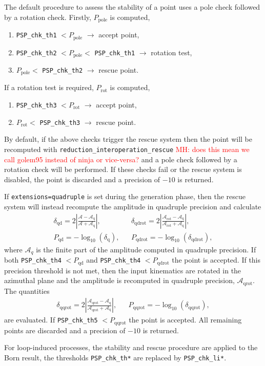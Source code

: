 The default procedure to assess the stability of a point uses a pole check followed by a rotation check.
Firstly, $P_\mathrm{pole}$ is computed,
\begin{enumerate}
\item \texttt{PSP\_chk\_th1} $< P_\mathrm{pole}$ $\rightarrow$ accept point,
\item \texttt{PSP\_chk\_th2} $< P_\mathrm{pole} < $ \texttt{PSP\_chk\_th1} $\rightarrow$ rotation test,
\item $P_\mathrm{pole} <$ \texttt{PSP\_chk\_th2} $\rightarrow$ rescue point.
\end{enumerate}
If a rotation test is required, $P_\mathrm{rot}$ is computed,
\begin{enumerate}
\item \texttt{PSP\_chk\_th3} $< P_\mathrm{rot}$ $\rightarrow$ accept point,
\item  $P_\mathrm{rot} <$ \texttt{PSP\_chk\_th3} $\rightarrow$ rescue point.
\end{enumerate}

By default, if the above checks trigger the rescue system then the point will be recomputed with \texttt{reduction\_interoperation\_rescue} \textcolor{red}{MH: does this mean we call golem95 instead of ninja or vice-versa?} and a pole check followed by a rotation check will be performed.
If these checks fail or the rescue system is disabled, the point is discarded and a precision of $-10$ is returned.

If \texttt{extensions=quadruple} is set during the \gosam generation phase, then the rescue system will instead recompute the amplitude in quadruple precision and calculate
\begin{align}
&\delta_\mathrm{qd} = 2 \left| \frac{\mathcal{A}-\mathcal{A}_\mathrm{q}}{\mathcal{A}+\mathcal{A}_\mathrm{q}} \right|,&
&\delta_\mathrm{qdrot} = 2 \left| \frac{\mathcal{A}_\mathrm{rot}-\mathcal{A}_\mathrm{q}}{\mathcal{A}_\mathrm{rot}+\mathcal{A}_\mathrm{q}} \right|, & \\
&P_\mathrm{qd} = -\log_\mathrm{10}(\delta_\mathrm{q}),&
&P_\mathrm{qdrot} = -\log_\mathrm{10}(\delta_\mathrm{qdrot}),&
\end{align}
where $\mathcal{A}_q$ is the finite part of the amplitude computed in quadruple precision.
If both \texttt{PSP\_chk\_th4} $< P_\mathrm{qd}$ and \texttt{PSP\_chk\_th4} $< P_\mathrm{qdrot}$ the point is accepted.
If this precision threshold is not met, then the input kinematics are rotated in the azimuthal plane and the amplitude is recomputed in quadruple precision, $\mathcal{A}_\mathrm{qrot}$.
The quantities
\begin{align}
&\delta_\mathrm{qqrot} = 2 \left| \frac{\mathcal{A}_\mathrm{qrot}-\mathcal{A}_\mathrm{q}}{\mathcal{A}_\mathrm{qrot}+\mathcal{A}_\mathrm{q}} \right|,&
&P_\mathrm{qqrot} = -\log_\mathrm{10}(\delta_\mathrm{qqrot}),&
\end{align}
are evaluated.
If \texttt{PSP\_chk\_th5} $< P_\mathrm{qqrot}$ the point is accepted. 
All remaining points are discarded and a precision of $-10$ is returned.

For loop-induced processes, the stability and rescue procedure are applied to the Born result, the thresholds \texttt{PSP\_chk\_th*} are replaced by \texttt{PSP\_chk\_li*}.